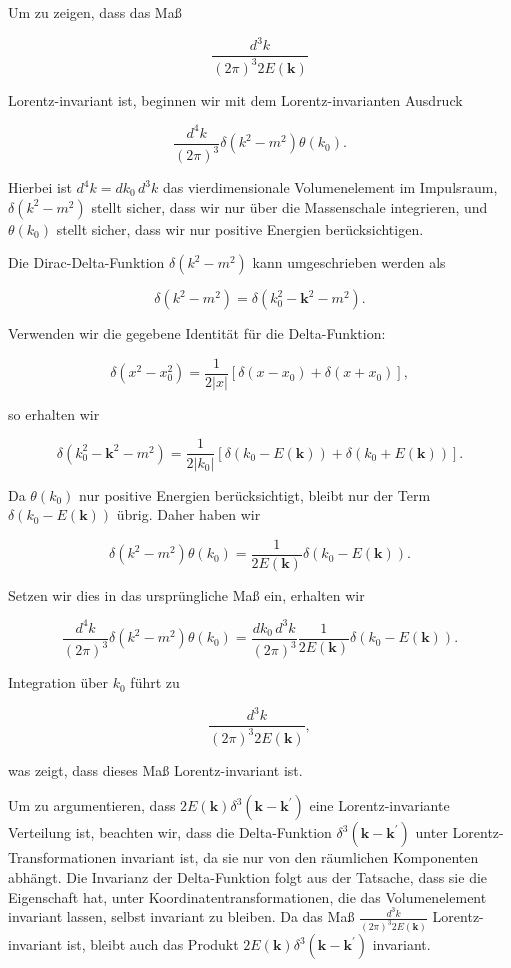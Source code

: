 Um zu zeigen, dass das Maß 

\[
\frac{d^3 k}{(2 \pi)^3 2 E(\mathbf{k})}
\]

Lorentz-invariant ist, beginnen wir mit dem Lorentz-invarianten Ausdruck 

\[
\frac{d^4 k}{(2 \pi)^3} \delta\left(k^2 - m^2\right) \theta\left(k_0\right).
\]

Hierbei ist $d^4 k = dk_0 \, d^3 k$ das vierdimensionale Volumenelement im Impulsraum, $\delta\left(k^2 - m^2\right)$ stellt sicher, dass wir nur über die Massenschale integrieren, und $\theta\left(k_0\right)$ stellt sicher, dass wir nur positive Energien berücksichtigen.

Die Dirac-Delta-Funktion $\delta\left(k^2 - m^2\right)$ kann umgeschrieben werden als 

\[
\delta\left(k^2 - m^2\right) = \delta\left(k_0^2 - \mathbf{k}^2 - m^2\right).
\]

Verwenden wir die gegebene Identität für die Delta-Funktion:

\[
\delta\left(x^2 - x_0^2\right) = \frac{1}{2|x|}\left[\delta\left(x - x_0\right) + \delta\left(x + x_0\right)\right],
\]

so erhalten wir

\[
\delta\left(k_0^2 - \mathbf{k}^2 - m^2\right) = \frac{1}{2|k_0|} \left[\delta\left(k_0 - E(\mathbf{k})\right) + \delta\left(k_0 + E(\mathbf{k})\right)\right].
\]

Da $\theta(k_0)$ nur positive Energien berücksichtigt, bleibt nur der Term $\delta\left(k_0 - E(\mathbf{k})\right)$ übrig. Daher haben wir

\[
\delta\left(k^2 - m^2\right) \theta\left(k_0\right) = \frac{1}{2E(\mathbf{k})} \delta\left(k_0 - E(\mathbf{k})\right).
\]

Setzen wir dies in das ursprüngliche Maß ein, erhalten wir

\[
\frac{d^4 k}{(2 \pi)^3} \delta\left(k^2 - m^2\right) \theta\left(k_0\right) = \frac{dk_0 \, d^3 k}{(2 \pi)^3} \frac{1}{2E(\mathbf{k})} \delta\left(k_0 - E(\mathbf{k})\right).
\]

Integration über $k_0$ führt zu

\[
\frac{d^3 k}{(2 \pi)^3 2E(\mathbf{k})},
\]

was zeigt, dass dieses Maß Lorentz-invariant ist.

Um zu argumentieren, dass $2 E(\mathbf{k}) \delta^3\left(\mathbf{k} - \mathbf{k}^{\prime}\right)$ eine Lorentz-invariante Verteilung ist, beachten wir, dass die Delta-Funktion $\delta^3\left(\mathbf{k} - \mathbf{k}^{\prime}\right)$ unter Lorentz-Transformationen invariant ist, da sie nur von den räumlichen Komponenten abhängt. Die Invarianz der Delta-Funktion folgt aus der Tatsache, dass sie die Eigenschaft hat, unter Koordinatentransformationen, die das Volumenelement invariant lassen, selbst invariant zu bleiben. Da das Maß $\frac{d^3 k}{(2 \pi)^3 2 E(\mathbf{k})}$ Lorentz-invariant ist, bleibt auch das Produkt $2 E(\mathbf{k}) \delta^3\left(\mathbf{k} - \mathbf{k}^{\prime}\right)$ invariant.
